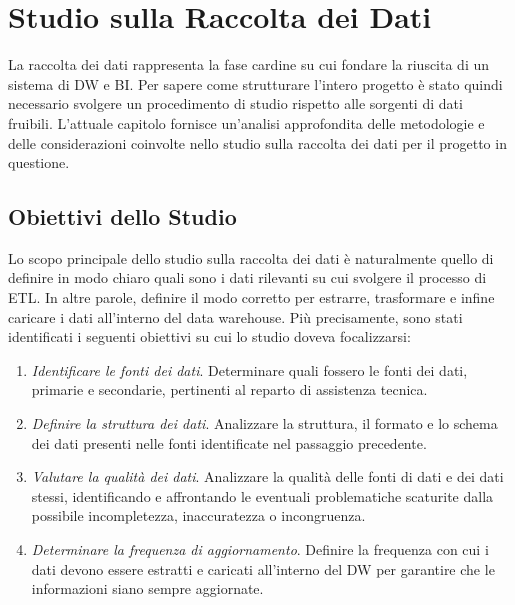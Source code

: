 \section{Studio sulla Raccolta dei Dati}

La raccolta dei dati rappresenta la fase cardine su cui fondare la riuscita di un sistema di DW e BI. Per sapere come strutturare l'intero progetto è stato quindi necessario svolgere un procedimento di studio rispetto alle sorgenti di dati fruibili. L'attuale capitolo fornisce un'analisi approfondita delle metodologie e delle considerazioni coinvolte nello studio sulla raccolta dei dati per il progetto in questione.

\subsection{Obiettivi dello Studio}

Lo scopo principale dello studio sulla raccolta dei dati è naturalmente quello di definire in modo chiaro quali sono i dati rilevanti su cui svolgere il processo di ETL. In altre parole, definire il modo corretto per estrarre, trasformare e infine caricare i dati all'interno del data warehouse. Più precisamente, sono stati identificati i seguenti obiettivi su cui lo studio doveva focalizzarsi:

\begin{enumerate}
    \item \textit{Identificare le fonti dei dati}. Determinare quali fossero le fonti dei dati, primarie e secondarie, pertinenti al reparto di assistenza tecnica.
    \item \textit{Definire la struttura dei dati}. Analizzare la struttura, il formato e lo schema dei dati presenti nelle fonti identificate nel passaggio precedente.
    \item \textit{Valutare la qualità dei dati}. Analizzare la qualità delle fonti di dati e dei dati stessi, identificando e affrontando le eventuali problematiche scaturite dalla possibile incompletezza, inaccuratezza o incongruenza.
    \item \textit{Determinare la frequenza di aggiornamento}. Definire la frequenza con cui i dati devono essere estratti e caricati all'interno del DW per garantire che le informazioni siano sempre aggiornate.
\end{enumerate}

